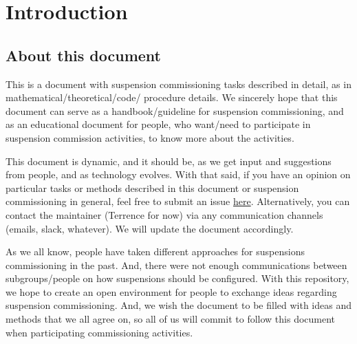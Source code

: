 \section{Introduction}

\subsection{About this document}
This is a document with suspension commissioning tasks described in detail, as in mathematical/theoretical/code/ procedure details.
We sincerely hope that this document can serve as a handbook/guideline for suspension commissioning, and as an educational document for people, who want/need to participate in suspension commission activities, to know more about the activities.

This document is dynamic, and it should be, as we get input and suggestions from people, and as technology evolves.
With that said, if you have an opinion on particular tasks or methods described in this document or suspension commissioning in general, feel free to submit an issue \href{https://github.com/gw-vis/vis-commissioning-tex/issues}{here}.
Alternatively, you can contact the maintainer (Terrence for now) via any communication channels (emails, slack, whatever).
We will update the document accordingly.

As we all know, people have taken different approaches for suspensions commissioning in the past.
And, there were not enough communications between subgroups/people on how suspensions should be configured.
With this repository, we hope to create an open environment for people to exchange ideas regarding suspension commissioning.
And, we wish the document to be filled with ideas and methods that we all agree on, so all of us will commit to follow this document when participating commissioning activities.

